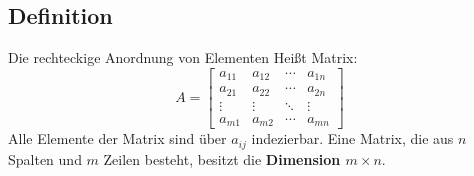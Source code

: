 \subsection{Definition}
Die rechteckige Anordnung von Elementen Heißt Matrix:
\begin{displaymath}
    A = 
    \begin{bmatrix} 
        a_{11} & a_{12} & \cdots & a_{1n} \\ 
        a_{21} & a_{22} & \cdots & a_{2n} \\ 
        \vdots & \vdots & \ddots & \vdots \\ 
        a_{m1} & a_{m2} & \cdots & a_{mn} 
    \end{bmatrix}
\end{displaymath}
Alle Elemente der Matrix sind über $a_{ij}$ indezierbar.
Eine Matrix, die aus $n$ Spalten und $m$ Zeilen besteht, besitzt die \textbf{Dimension $m \times n$}.

